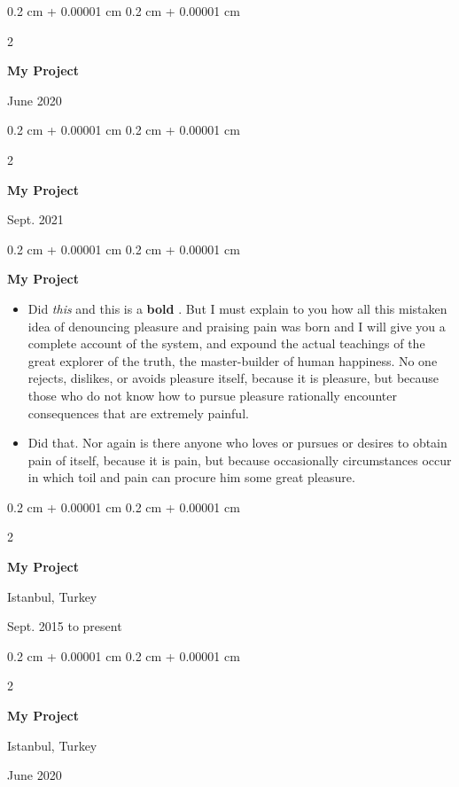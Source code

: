 \documentclass[10pt, letterpaper]{article}
\newenvironment{highlights}{
    \begin{itemize}[
        topsep=0.10 cm,
        parsep=0.10 cm,
        partopsep=0pt,
        itemsep=0pt,
        leftmargin=0.4 cm + 10pt
    ]
}{
    \end{itemize}
} %
\newenvironment{onecolentry}{
    \begin{adjustwidth}{
        0.2 cm + 0.00001 cm
    }{
        0.2 cm + 0.00001 cm
    }
}{
    \end{adjustwidth}
} %
\newenvironment{twocolentry}[2][]{
    \onecolentry
    \def\secondColumn{#2}
    \setcolumnwidth{\fill, 4.5 cm}
    \begin{paracol}{2}
}{
    \switchcolumn \raggedleft \secondColumn
    \end{paracol}
    \endonecolentry
} %
\let\hrefWithoutArrow\href
\renewcommand{\href}[2]{\hrefWithoutArrow{#1}{\mbox{\ifthenelse{\equal{#2}{}}{ }{#2 }\raisebox{.15ex}{\footnotesize \faExternalLink*}}}}
\begin{document}
        \vspace{0.2 cm}

        \begin{twocolentry}{
            June 2020
        }
            \textbf{My Project}
        \end{twocolentry}


        \vspace{0.2 cm}

        \begin{twocolentry}{
            Sept. 2021
        }
            \textbf{My Project}
        \end{twocolentry}


        \vspace{0.2 cm}

        \begin{onecolentry}
            \textbf{My Project}
            \begin{highlights}
                \item Did \textit{this} and this is a \textbf{bold} \href{https://example.com}{link}. But I must explain to you how all this mistaken idea of denouncing pleasure and praising pain was born and I will give you a complete account of the system, and expound the actual teachings of the great explorer of the truth, the master-builder of human happiness. No one rejects, dislikes, or avoids pleasure itself, because it is pleasure, but because those who do not know how to pursue pleasure rationally encounter consequences that are extremely painful.
                \item Did that. Nor again is there anyone who loves or pursues or desires to obtain pain of itself, because it is pain, but because occasionally circumstances occur in which toil and pain can procure him some great pleasure.
            \end{highlights}
        \end{onecolentry}


        \vspace{0.2 cm}

        \begin{twocolentry}{
            Istanbul, Turkey

        Sept. 2015 to present
        }
            \textbf{My Project}
        \end{twocolentry}


        \vspace{0.2 cm}

        \begin{twocolentry}{
            Istanbul, Turkey

        June 2020
        }
            \textbf{My Project}
        \end{twocolentry}
\end{document}
